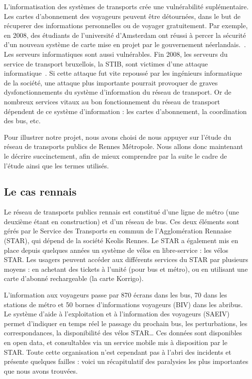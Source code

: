     	L'informatisation des systèmes de transports crée une vulnérabilité suplémentaire. Les cartes d'abonnement des voyageurs peuvent être détournées, dans le but de récuperer des informations personnelles ou de voyager gratuitement. Par exemple, en 2008, des étudiants de l'université d'Amsterdam ont réussi à percer la sécurité d'un nouveau système de carte mise en projet par le gouvernement néerlandais.~\cite{Amst_RFID}. Les serveurs informatiques sont aussi vulnérables. Fin 2008, les serveurs du service de transport bruxellois, la STIB, sont victimes d'une attaque informatique~\cite{STIB}. Si cette attaque fut vite repoussé par les ingénieurs informatique de la société, une attaque plus importante pourrait provoquer de graves dysfonctionnements du système d'information du réseau de transport. Or de nombreux services vitaux au bon fonctionnement du réseau de transport dépendent de ce système d'information : les cartes d'abonnement, la coordination des bus, etc.

    	Pour illustrer notre projet, nous avons choisi de nous appuyer sur l'étude du réseau de transports publics de Rennes Métropole. Nous allons donc maintenant le décrire succinctement, afin de mieux comprendre par la suite le cadre de l'étude ainsi que les termes utilisés.
                
    \subsection{Le cas rennais}
    	Le réseau de transports publics rennais est constitué d'une ligne de métro (une deuxième étant en construction) et d'un réseau de bus. Ces deux éléments sont gérés par le Service des Transports en commun de l'Agglomération Rennaise (STAR), qui dépend de la société Keolis Rennes. Le STAR a également mis en place depuis quelques années un système de vélos en libre-service : les vélos STAR. Les usagers peuvent accéder aux différents services du STAR par plusieurs moyens : en achetant des tickets à l'unité (pour bus et métro), ou en utilisant une carte d'abonné rechargeable (la carte Korrigo). 
                


        L'information aux voyageurs passe par 870 écrans dans les bus, 70 dans les stations de métro et 50 bornes d’informations voyageurs (BIV) dans les abribus. Le système d’aide à l’exploitation et à l’information des voyageurs (SAEIV) permet d’indiquer en temps réel le passage du prochain bus, les perturbations, les correspondances, la disponibilité des vélos STAR… 
        Ces données sont disponibles en open data, et consultables via un service mobile mis à disposition par le STAR. Toute cette organisation n'est cependant pas à l'abri des incidents et présente quelques failles : voici un récapitulatif des paralysies les plus importantes que nous avons trouvées. 
        
